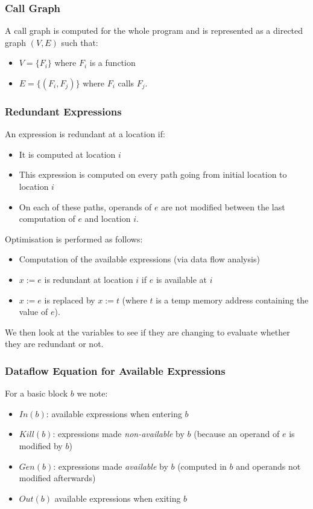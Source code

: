 \documentclass[11pt,a4paper,titlepage,dvipsnames,cmyk]{scrartcl}
\begin{document}
\subsubsection{Call Graph}
A call graph is computed for the whole program and is represented as a directed graph $(V,E)$ such that:
\begin{itemize}
    \item $V = \{F_i\}$ where $F_i$ is a function
    \item $E = \{(F_i,F_j)\}$ where $F_i$ calls $F_j$.
\end{itemize}

\subsubsection{Redundant Expressions}
An expression is redundant at a location if:
\begin{itemize}
    \item It is computed at location $i$
    \item This expression is computed on every path going from initial location to location $i$
    \item On each of these paths, operands of $e$ are not modified between the last computation of $e$ and location $i$.
\end{itemize}

Optimisation is performed as follows:
\begin{itemize}
    \item Computation of the available expressions (via data flow analysis)
    \item $x:=e$ is redundant at location $i$ if $e$ is available at $i$
    \item $x:=e$ is replaced by $x:=t$ (where $t$ is a temp memory address containing the value of $e$).
\end{itemize}

We then look at the variables to see if they are changing to evaluate whether they are redundant or not.

\subsubsection{Dataflow Equation for Available Expressions}
For a basic block $b$ we note:
\begin{itemize}
    \item $In(b)$: available expressions when entering $b$
    \item $Kill(b)$: expressions made \textit{non-available} by $b$ (because an operand of $e$ is modified by $b$)
    \item $Gen(b)$: expressions made \textit{available} by $b$ (computed in $b$ and operands not modified afterwards)
    \item $Out(b)$ available expressions when exiting $b$
\end{itemize}
\end{document}
